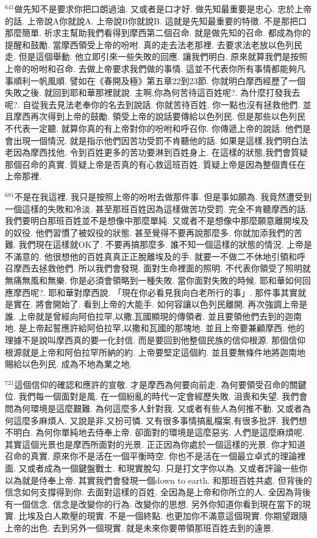 \documentclass{book}
\begin{document}
$^{641}$做先知不是要求你把口朗過油.
又或者是口才好.
做先知最重要是忠心.
忠於上帝的話.
上帝說A你就說A.
上帝說B你就說B.
這就是先知最重要的特徵.
不是那把口那麼簡單.
祈求主幫助我們看得到摩西第二個召命.
就是做先知的召命.
都成為你的提醒和鼓勵.
當摩西領受上帝的吩咐.
真的走去法老那裡.
去要求法老放以色列民走.
但是這個舉動.
他立即引來一些失敗的回應.
讓我們明白.
原來就算我們是按照上帝的吩咐和召命.
去做上帝要求我們做的事情.
這並不代表你所有事情都能夠凡事順利一帆風順.
譬如在《春開及極》第五章22到23節.
你就明白摩西經歷了一個失敗之後.
就回到耶和華那裡就說.
主啊,你為何苦待這百姓呢?.
為什麼打發我去呢?.
自從我去見法老奉你的名去到說話.
你就苦待百姓.
你一點也沒有拯救他們.
並且摩西再次得到上帝的鼓勵.
領受上帝的說話要傳給以色列民.
但是那些以色列民不代表一定聽.
就算你真的有上帝對你的吩咐和呼召你.
你傳遞上帝的說話.
他們是會出現一個情況.
就是指示他們因苦功受罰不肯聽他的話.
如果是這樣,我們明白法老因為摩西找他.
令到百姓更多的苦功要淋到百姓身上.
在這樣的狀態,我們會質疑那個召命的真實.
質疑上帝是否真的有心救這班百姓.
質疑上帝是因為整個責任在上帝那裡.

$^{681}$不是在我這裡.
我只是按照上帝的吩咐去做那件事.
但是事如願為.
我竟然遭受到一個這樣的失敗和冷淡.
甚至那班百姓因為這樣做苦功受罰.
完全不肯聽摩西的話.
我們要明白那班百姓並不是想像中那麼單純.
又或者不是想像中那麼願意離開埃及的奴役.
他們習慣了被奴役的狀態.
甚至覺得不要再說那麼多.
你就加添我們的苦難.
我們現在這樣就OK了.
不要再搞那麼多.
誰不知一個這樣的狀態的情況.
上帝是不滿意的.
他很想他的百姓真真正正脫離埃及的手.
就要一不做二不休地引領和呼召摩西去拯救他們.
所以我們會發現.
面對生命裡面的照明.
不代表你領受了照明就無痛無風和無樂.
你是必須會領略到一種失敗.
當你面對失敗的時候.
耶和華如何回應摩西呢?.
耶和華對摩西說.
「現在你必看見我向白老所行的事」.
那件事其實就是實在.
將會開始了.
看到上帝的大能手.
如何容讓以色列民離開.
再次強調上帝是誰.
上帝就是曾經向阿伯拉罕,以撒,瓦國顯現的傳領者.
並且要領他們去到的迦南地.
是上帝起誓應許給阿伯拉罕,以撒和瓦國的那塊地.
並且上帝要兼顧摩西.
他的理據不是說叫摩西真的要一化封信.
而是要回到他整個民族的信仰根源.
那個信仰根源就是上帝和阿伯拉罕所納的約.
上帝要堅定這個約.
並且要無條件地將迦南地賜給以色列民.
成為不地為業之地.

$^{721}$這個信仰的確認和應許的宣敬.
才是摩西為何要向前走.
為何要領受召命的關鍵位.
我們每一個面對是風.
在一個紛亂的時代一定會經歷失敗.
沮喪和失望.
我們會問為何環境是這麼艱難.
為何這麼多人針對我.
又或者有些人為何推不動.
又或者為何這麼多麻煩人.
又說是非,又扮可憐.
又有很多事情搞亂檔案,有很多批評.
我們想不明白.
為何你單純地去侍奉上帝.
卻面對的環境是這麼惡劣.
人們是這麼麻煩呢.
其實這個光景也是摩西所面對的光景.
正正因為你處於一個這樣的光景.
你才知道召命的真實.
原來你不是活在一個平衡時空.
你也不是活在一個最立卓式的理論裡面.
又或者成為一個鍵盤戰士.
和現實脫勾.
只是打文字你以為.
又或者評論一些你以為就是侍奉上帝.
其實我們會發現一個down to earth.
和那班百姓共處.
但背後的信念如何支撐得到你.
去面對這樣的百姓.
全因為是上帝和你所立的人.
全因為背後有一個信念.
信念是改變你的行為.
改變你的思想.
另外你知道你看到現在當下的現實.
比埃及白人欺壓的現實.
不是一個終點.
也更加你不滿意這個現實.
你期望跟隨上帝的出色.
去到另外一個現實.
就是未來你要帶領那班百姓去到的遠景.
\end{document}
